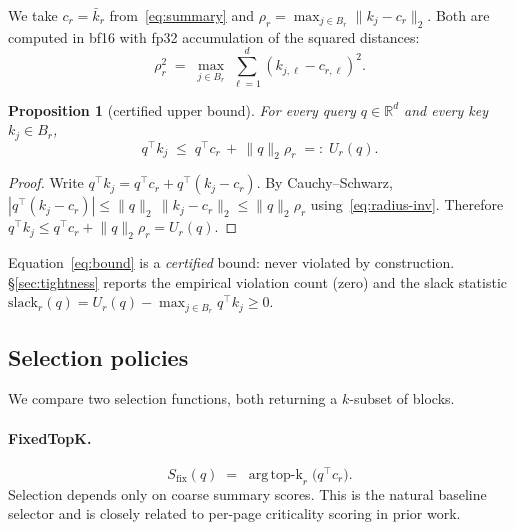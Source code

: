 \documentclass[11pt]{article}
\theoremstyle{plain}
\newtheorem{proposition}{Proposition}
\theoremstyle{definition}
\newcommand{\R}{\mathbb{R}}
\DeclareMathOperator*{\argtopk}{arg\,top\text{-}k}
\newcommand{\ur}{U_r}
\newcommand{\normq}{\lVert q \rVert_2}
\newcommand{\rad}{\rho_r}
\begin{document}
We take $c_r = \bar k_r$ from~\eqref{eq:summary} and
$\rad = \max_{j \in B_r} \|k_j - c_r\|_2$. Both are computed in bf16 with
fp32 accumulation of the squared distances:
\begin{equation}
\rad^2 \;=\; \max_{j \in B_r} \, \sum_{\ell=1}^{d} (k_{j,\ell} - c_{r,\ell})^2. \label{eq:rad-compute}
\end{equation}

\begin{proposition}[certified upper bound]
\label{prop:cert}
For every query $q \in \R^{d}$ and every key $k_j \in B_r$,
\begin{equation}
q^{\top} k_j \;\le\; q^{\top} c_r \,+\, \normq \rad \;=:\; \ur(q). \label{eq:bound}
\end{equation}
\end{proposition}

\begin{proof}
Write $q^{\top} k_j = q^{\top} c_r + q^{\top} (k_j - c_r)$. By
Cauchy--Schwarz, $|q^{\top}(k_j - c_r)| \le \normq \, \|k_j - c_r\|_2 \le \normq \rad$
using~\eqref{eq:radius-inv}. Therefore
$q^{\top} k_j \le q^{\top} c_r + \normq \rad = \ur(q)$. \qedhere
\end{proof}

Equation~\eqref{eq:bound} is a \emph{certified} bound: never violated by
construction. \S\ref{sec:tightness} reports the empirical violation
count (zero) and the slack statistic
$\text{slack}_r(q) = \ur(q) - \max_{j \in B_r} q^{\top} k_j \ge 0$.

\subsection{Selection policies}
\label{sec:selectors}

We compare two selection functions, both returning a $k$-subset of blocks.

\paragraph{FixedTopK.}
\begin{equation}
S_{\mathrm{fix}}(q) \;=\; \argtopk_r\bigl(q^{\top} c_r\bigr). \label{eq:fixed}
\end{equation}
Selection depends only on coarse summary scores. This is the natural
baseline selector and is closely related to per-page criticality scoring
in prior work.
\end{document}
